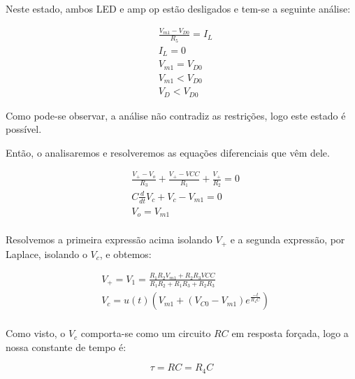 Neste estado, ambos LED e amp op estão desligados e tem-se a seguinte análise:

\begin{equation}
    \begin{aligned}
         & \frac{V_{m1} - V_{D0}}{R_5} = I_L \\
         & I_L = 0                           \\
         & V_{m1} = V_{D0}                   \\
         & V_{m1} < V_{D0}                   \\
         & V_D < V_{D0}
    \end{aligned}
\end{equation}

Como pode-se observar, a análise não contradiz as restrições, logo este estado é possível.

Então, o analisaremos e resolveremos as equações diferenciais que vêm dele.

\begin{equation}
    \begin{aligned}
         & \frac{V_{+} - V_{o}}{R_3} +  \frac{V_{+} - VCC}{R_1} + \frac{V_{+}}{R_2} = 0 \\
         & C \frac{d}{d t} V_{c} + V_{c} - V_{m1} = 0                                   \\
         & V_{o} = V_{m1}                                                               \\
    \end{aligned}
\end{equation}

Resolvemos a primeira expressão acima isolando $V_{+}$ e a segunda expressão, por Laplace, isolando o $V_c$, e obtemos:

\begin{equation}
    \begin{aligned}
         & V_{+} = V_1 = \frac{R_{1} R_{2} V_{m1} + R_{2} R_{3} VCC}{R_{1} R_{2} + R_{1} R_{3} + R_{2} R_{3}} \\
         & V_c = u(t) \left( V_{m1} + (V_{C0} - V_{m1}) e^{\frac{-t}{R_4 C}} \right)                          \\
    \end{aligned}
\end{equation}

Como visto, o $V_c$ comporta-se como um circuito $RC$ em resposta forçada, logo a nossa constante de tempo é:

\begin{equation}
    \tau = R C = R_4 C
\end{equation}

